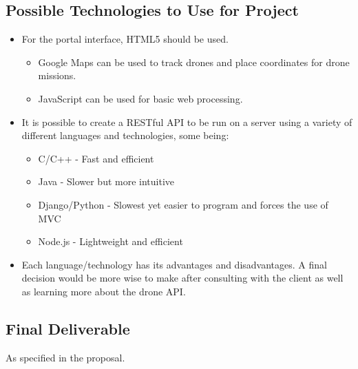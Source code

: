 \documentclass{article}
\begin{document}
	\subsection{Possible Technologies to Use for Project}
		\begin{itemize}
			\item For the portal interface, HTML5 should be used.
			\begin{itemize}
				\item Google Maps can be used to track drones and place coordinates for drone missions.
				\item JavaScript can be used for basic web processing.
			\end{itemize}
			\item It is possible to create a RESTful API to be run on a server using a variety of different languages and technologies, some being:
			\begin{itemize}
				\item C/C++ - Fast and efficient
				\item Java - Slower but more intuitive
				\item Django/Python - Slowest yet easier to program and forces the use of MVC
				\item Node.js - Lightweight and efficient
			\end{itemize}
			\item Each language/technology has its advantages and disadvantages. A final decision would be more wise to make after consulting with the client as well as learning more about the drone API.
		\end{itemize}
	\subsection{Final Deliverable}
	As specified in the proposal.
\end{document}
